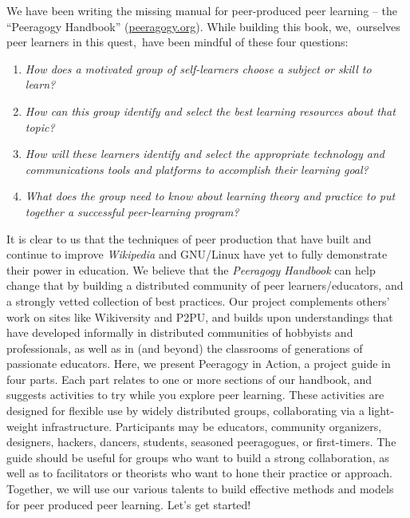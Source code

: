 We have been writing the missing manual for peer-produced peer
learning -- the ``Peeragogy Handbook''
(\href{http://peeragogy.org/}{peeragogy.org}).  While building this
book, we,~ourselves peer learners in this quest,~have been mindful of
these four questions:

\begin{enumerate}
\itemsep1pt\parskip0pt
\item
  \emph{How does a motivated group of self-learners choose a subject or
  skill to learn?~}
\item
  \emph{How can this group identify and select the best learning
  resources about that topic?~}
\item
  \emph{How will these learners identify and select the appropriate
  technology and communications tools and platforms to accomplish their
  learning goal?}
\item
  \emph{What does the group need to know about learning theory and
  practice to put together a successful peer-learning program?}
\end{enumerate}

It is clear to us that the techniques of peer production that have built
and continue to improve \emph{Wikipedia} and GNU/Linux have yet to fully
demonstrate their power in education. We believe that the
\emph{Peeragogy Handbook} can help change that by building a distributed
community of peer learners/educators, and a strongly vetted collection
of best practices. Our project complements others' work on sites like
Wikiversity and P2PU, and builds upon understandings that have
developed informally in distributed communities of hobbyists and
professionals, as well as in (and beyond) the classrooms of
generations of passionate educators. Here, we present Peeragogy in
Action, a project guide in four parts. Each part relates to one or
more sections of our handbook, and suggests activities to try while
you explore peer learning. These activities are designed for flexible
use by widely distributed groups, collaborating via a light-weight
infrastructure. Participants may be educators, community organizers,
designers, hackers, dancers, students, seasoned peeragogues, or
first-timers. The guide should be useful for groups who want to build
a strong collaboration, as well as to facilitators or theorists who
want to hone their practice or approach.  Together, we will use our
various talents to build effective methods and models for peer
produced peer learning. Let's get started!


\noindent{}

